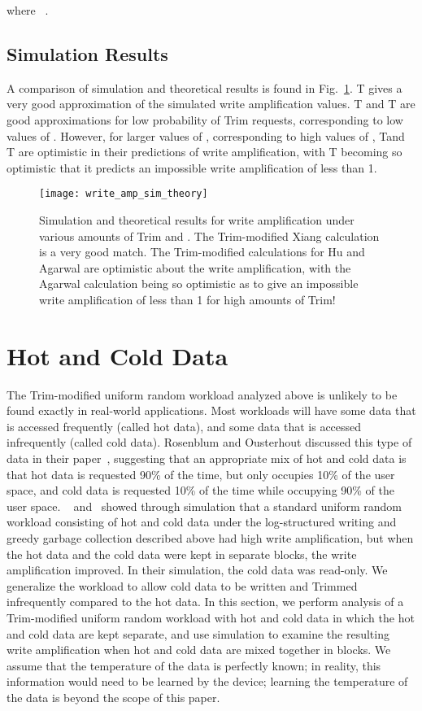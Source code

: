 \documentclass[prodmode,acmtos]{acmsmall}
\begin{document}
where ~\cite{frankie2012_ciit}.

\subsection{Simulation Results}
A comparison of simulation and theoretical results is found in Fig.~\ref{fig:write_amp_sim_theory}.  T gives a very good approximation of the simulated write amplification values. T and T are good approximations for low probability of Trim requests, corresponding to low values of .  However, for larger values of , corresponding to high values of , Tand T are optimistic in their predictions of write amplification, with T becoming so optimistic that it predicts an impossible write amplification of less than 1.

\begin{figure}
\centerline{\texttt{[image: write\_amp\_sim\_theory]}}
\caption{Simulation and theoretical results for write amplification under various amounts of Trim and .  The Trim-modified Xiang calculation is a very good match.  The Trim-modified calculations for Hu and Agarwal are optimistic about the write amplification, with the Agarwal calculation being so optimistic as to give an impossible write amplification of less than 1 for high amounts of Trim!}
\label{fig:write_amp_sim_theory}
\end{figure}







\section{Hot and Cold Data}
The Trim-modified uniform random workload analyzed above is unlikely to be found exactly in real-world applications.  Most workloads will have some data that is accessed frequently (called hot data), and some data that is accessed infrequently (called cold data).  Rosenblum and Ousterhout discussed this type of data in their paper~\cite{rosenblum1992design}, suggesting that an appropriate mix of hot and cold data is that hot data is requested 90\% of the time, but only occupies 10\% of the user space, and cold data is requested 10\% of the time while occupying 90\% of the user space.  ~ and~ showed through simulation that a standard uniform random workload consisting of hot and cold data under the log-structured writing and greedy garbage collection described above had high write amplification, but when the hot data and the cold data were kept in separate blocks, the write amplification improved.  In their simulation, the cold data was read-only.  We generalize the workload to allow cold data to be written and Trimmed infrequently compared to the hot data.  In this section, we perform analysis of a Trim-modified uniform random workload with hot and cold data in which the hot and cold data are kept separate, and use simulation to examine the resulting write amplification when hot and cold data are mixed together in blocks.  We assume that the temperature of the data is perfectly known; in reality, this information would need to be learned by the device; learning the temperature of the data is beyond the scope of this paper.
\end{document}
